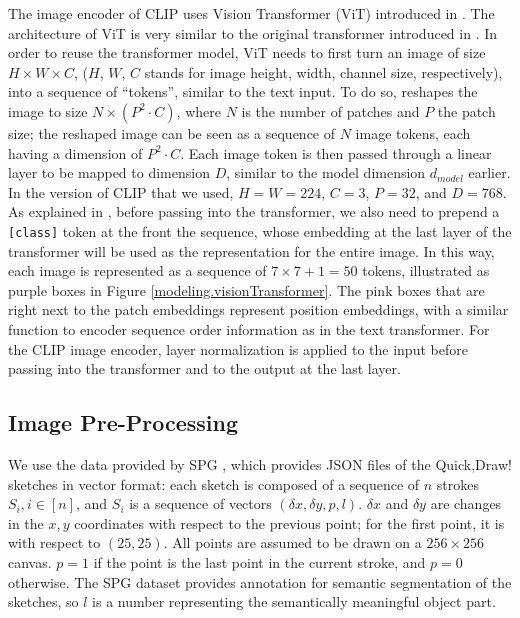 The image encoder of CLIP uses Vision Transformer (ViT) introduced in \cite{ViT}. The architecture of ViT is very similar to the original transformer introduced in \cite{attentionAllYouNeed}. 
In order to reuse the transformer model, ViT needs to first turn an image of size $H\times W \times C$, ($H$, $W$, $C$ stands for image height, width, channel size, respectively), into a sequence of ``tokens'', similar to the text input.  
To do so, \cite{ViT} reshapes the image to size $N \times (P^2 \cdot C)$, where $N$ is the number of patches and $P$ the patch size; the reshaped image can be seen as a sequence of $N$ image tokens, each having a dimension of $P^2 \cdot C$. Each image token is then passed through a linear layer to be mapped to dimension $D$, similar to the model dimension $d_{model}$ earlier. 
In the version of CLIP that we used, $H = W = 224$, $C = 3$, $P = 32$, and $D = 768$. 
As explained in \cite{ViT}, before passing into the transformer, we also need to prepend a \texttt{[class]} token at the front the sequence, whose embedding at the last layer of the transformer will be used as the representation for the entire image. In this way, each image is represented as a sequence of $7\times 7 + 1 = 50$ tokens, illustrated as purple boxes in Figure \ref{modeling.visionTransformer}. The pink boxes that are right next to the patch embeddings represent position embeddings, with a similar function to encoder sequence order information as in the text transformer. 
For the CLIP image encoder, layer normalization is applied to the input before passing into the transformer and to the output at the last layer.


\subsection{Image Pre-Processing}
We use the data provided by SPG \citep{spg_paper}, which provides JSON files of the Quick,Draw! sketches in vector format: each sketch is composed of a sequence of $n$ strokes $S_i, i \in [n]$, and $S_i$ is a sequence of vectors $(\delta x,\delta y, p, l)$. $\delta x$ and $\delta y$ are changes in the $x,y$ coordinates with respect to the previous point; for the first point, it is with respect to $(25,25)$. All points are assumed to be drawn on a $256 \times 256$ canvas. $p=1$ if the point is the last point in the current stroke, and $p=0$ otherwise. The SPG dataset provides annotation for semantic segmentation of the sketches, so $l$ is a number representing the semantically meaningful object part.  

